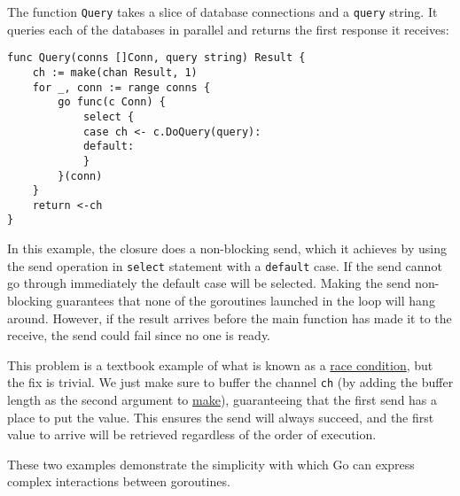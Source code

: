 The function \texttt{Query} takes a slice of database connections and a
\texttt{query} string. It queries each of the databases in parallel and
returns the first response it receives:

\begin{Verbatim}[frame=single]
func Query(conns []Conn, query string) Result {
	ch := make(chan Result, 1)
	for _, conn := range conns {
		go func(c Conn) {
			select {
			case ch <- c.DoQuery(query):
			default:
			}
		}(conn)
	}
	return <-ch
}
\end{Verbatim}

In this example, the closure does a non-blocking send, which it achieves
by using the send operation in \texttt{select} statement with a
\texttt{default} case. If the send cannot go through immediately the
default case will be selected. Making the send non-blocking guarantees
that none of the goroutines launched in the loop will hang around.
However, if the result arrives before the main function has made it to
the receive, the send could fail since no one is ready.

This problem is a textbook example of what is known as a
\href{https://en.wikipedia.org/wiki/Race\_condition}{race condition},
but the fix is trivial. We just make sure to buffer the channel
\texttt{ch} (by adding the buffer length as the second argument to
\href{/pkg/builtin/\#make}{make}), guaranteeing that the first send has
a place to put the value. This ensures the send will always succeed, and
the first value to arrive will be retrieved regardless of the order of
execution.

These two examples demonstrate the simplicity with which Go can express
complex interactions between goroutines.
